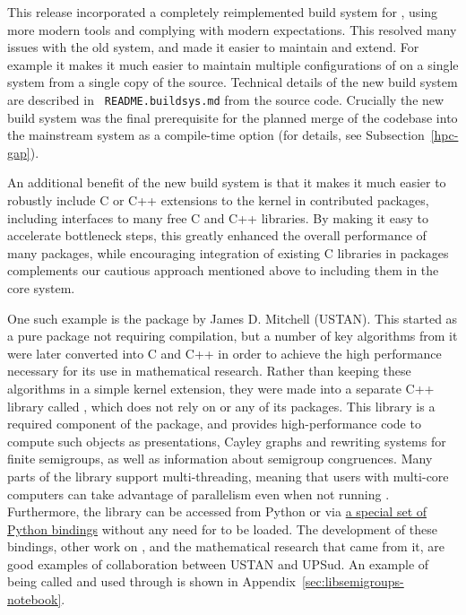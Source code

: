 This release incorporated a completely
reimplemented build system for \GAP, using more modern tools and
complying with modern expectations. This resolved many issues with the
old system, and made it easier to maintain and extend. For example it
makes it much easier to maintain multiple configurations of \GAP on a
single system from a single copy of the source. Technical
details of the new build system are described in {\tt
  README.buildsys.md} from the \GAP source code. Crucially the new build system
was the final prerequisite for the planned  merge of the \HPCGAP codebase  into the
mainstream \GAP system as a compile-time option (for details, see
Subsection~\ref{hpc-gap}).

An additional benefit of the new build system is that it makes it much
easier to robustly include C or C++ extensions to the \GAP kernel in
contributed packages, including interfaces to many free C and C++
libraries. By making it easy to accelerate bottleneck steps, this
greatly enhanced the overall performance of many packages, while
encouraging integration of existing C libraries in packages complements
our cautious approach mentioned above to including them in the core
system.

One such example is the  package \cite{Semigroups} by James D.
Mitchell (USTAN).  This started as a pure \GAP package not requiring compilation,
but a number of key algorithms from it were later converted into C and C++ in
order to achieve the high performance necessary for its use in mathematical
research.  Rather than keeping these algorithms in a simple \GAP kernel
extension, they were made into a separate C++ library called 
\cite{libsemigroups}, which does not rely on \GAP or any of its packages.  This
library is a required component of the  package, and provides
high-performance code to compute such objects as presentations, Cayley graphs
and rewriting systems for finite semigroups, as well as information about
semigroup congruences.  Many parts of the library support multi-threading,
meaning that users with multi-core computers can take advantage of parallelism
even when not running \HPCGAP.  Furthermore, the library can be accessed from
Python or \Sage via \href{https://github.com/libsemigroups/libsemigroups-python-bindings}{a special set of Python bindings}
 without
any need for \GAP to be loaded.  The development of these bindings, other work
on , and the mathematical research that came from it, are
good examples of \ODK collaboration between USTAN and UPSud.
An example of  being called and used through \GAP is shown in
Appendix~\ref{sec:libsemigroups-notebook}.

